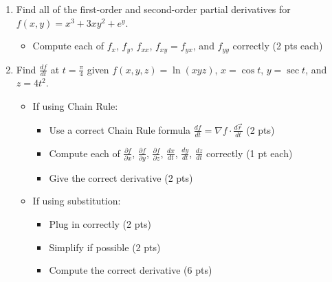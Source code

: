 \documentclass[12pt]{article}
\newcommand{\liner}{\noindent\underline{\hspace*{7in}}}
\begin{document}
\begin{enumerate}
\vspace*{7in}

\liner

\newpage


\item Find all of the first-order and second-order partial derivatives for $f(x,y) = x^3+3xy^2+e^y$.

  \begin{itemize}
    \item Compute each of $f_x$, $f_y$, $f_{xx}$, $f_{xy}=f_{yx}$, and $f_{yy}$ correctly (2 pts each)
  \end{itemize}

\vspace*{8in}

\liner

\newpage


\item Find $\frac{df}{dt}$ at $t=\frac{\pi}{4}$ given $f(x,y,z)=\ln(xyz)$, $x=\cos t$, $y=\sec t$, and $z=4t^2$.

  \begin{itemize}
    \item If using Chain Rule:
      \begin{itemize}
        \item Use a correct Chain Rule formula $\frac{df}{dt}=\nabla f \cdot \frac{d\vec{r}}{dt}$ (2 pts)
        \item Compute each of $\frac{\partial f}{\partial x}$, $\frac{\partial f}{\partial y}$, $\frac{\partial f}{\partial z}$, $\frac{d x}{d t}$, $\frac{d y}{d t}$, $\frac{d z}{d t}$ correctly (1 pt each)
        \item Give the correct derivative (2 pts)
      \end{itemize}
    \item If using substitution:
      \begin{itemize}
        \item Plug in correctly (2 pts)
        \item Simplify if possible (2 pts)
        \item Compute the correct derivative (6 pts)
      \end{itemize}
  \end{itemize}

\vspace*{6in}

\liner


\end{enumerate}
\end{document}
